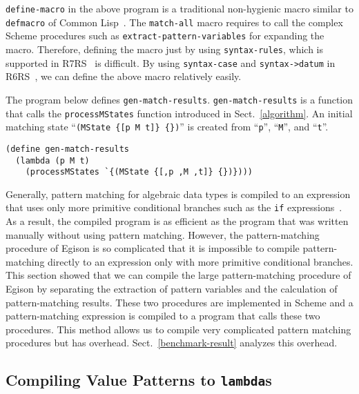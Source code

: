 \documentclass[acmlarge]{acmart}
\newcommand{\new}[1]{\textcolor{blue}{#1}}
\begin{document}
\noindent
\lstinline{define-macro} in the above program is a traditional non-hygienic macro similar to \lstinline{defmacro} of Common Lisp~\cite{gaucheTM}.
The \lstinline{match-all} macro requires to call the complex Scheme procedures such as \lstinline{extract-pattern-variables} for expanding the macro.
Therefore, defining the macro just by using \lstinline{syntax-rules}, which is supported in R7RS~\cite{shinn2013revised} is difficult.
By using \lstinline{syntax-case} and \lstinline{syntax->datum} in R6RS~\cite{sperber2009revised}, we can define the above macro relatively easily.

The program below defines \lstinline{gen-match-results}.
\lstinline{gen-match-results} is a function that calls the \lstinline{processMStates} function introduced in Sect.~\ref{algorithm}.
An initial matching state ``\lstinline|(MState {[p M t]} {})|'' is created from ``\lstinline{p}'', ``\lstinline{M}'', and ``\lstinline{t}''.

\begin{lstlisting}[language=egison]
(define gen-match-results
  (lambda (p M t)
    (processMStates `{(MState {[,p ,M ,t]} {})})))
\end{lstlisting}

\medskip

Generally, pattern matching for algebraic data types is compiled to an expression that uses only more primitive conditional branches such as the \texttt{if} expressions~\cite{peyton1987implementation}.
As a result, the compiled program is as efficient as the program that was written manually without using pattern matching.  
However, the pattern-matching procedure of Egison is so complicated that it is impossible to compile pattern-matching directly to an expression only with more primitive conditional branches.
This section showed that we can compile the large pattern-matching procedure of Egison by separating the extraction of pattern variables and the calculation of pattern-matching results.
These two procedures are implemented in Scheme and a pattern-matching expression is compiled to a program that calls these two procedures.
This method allows us to compile very complicated pattern matching procedures but has overhead.
Sect.~\ref{benchmark-result} analyzes this overhead.

\subsection{Compiling Value Patterns to \lstinline{lambda}s}\label{method-val-pat}
\end{document}
